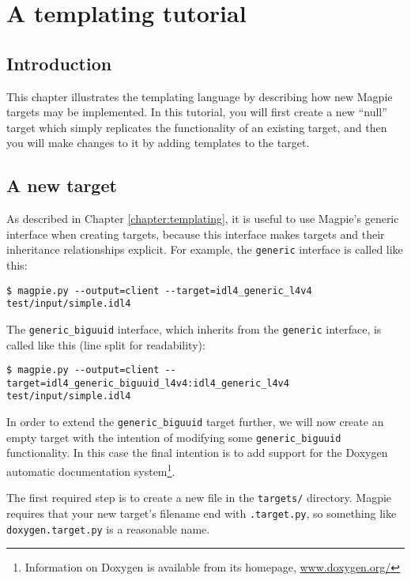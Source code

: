 \chapter{A templating tutorial}

\section{Introduction}

This chapter illustrates the templating language by describing how new Magpie targets may be implemented. In this tutorial, you will first create a new ``null'' target which simply replicates the functionality of an existing target, and then you will make changes to it by adding templates to the target.

\section{A new target}
As described in Chapter \ref{chapter:templating}, it is useful to use Magpie's generic interface when creating targets, because this interface makes targets and their inheritance relationships explicit. For example, the {\tt generic} interface is called like this:

\begin{verbatim}
$ magpie.py --output=client --target=idl4_generic_l4v4 test/input/simple.idl4
\end{verbatim}

The {\tt generic\_biguuid} interface, which inherits from the {\tt generic} interface, is called like this (line split for readability):

\begin{verbatim}
$ magpie.py --output=client --target=idl4_generic_biguuid_l4v4:idl4_generic_l4v4
test/input/simple.idl4
\end{verbatim}

In order to extend the {\tt generic\_biguuid} target further, we will now create an empty target with the intention of modifying some {\tt generic\_biguuid} functionality. In this case the final intention is to add support for the Doxygen automatic documentation system\footnote{Information on Doxygen is available from its homepage, \url{www.doxygen.org/}}.

The first required step is to create a new file in the {\tt targets/} directory. Magpie requires that your new target's filename end with {\tt .target.py}, so something like {\tt doxygen.target.py} is a reasonable name.

